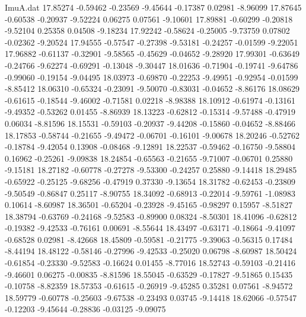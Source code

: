 \begin{filecontents}{ImuA.dat}
  17.85274   -0.59462   -0.23569   -9.45644   -0.17387    0.02981   -8.96099
  17.87645   -0.60538   -0.20937   -9.52224    0.06275    0.07561   -9.10601
  17.89881   -0.60299   -0.20818   -9.52104    0.25358    0.04508   -9.18234
  17.92242   -0.58624   -0.25005   -9.73759    0.07802   -0.02362   -9.20524
  17.94555   -0.57547   -0.27398   -9.53181   -0.24257   -0.01599   -9.22051
  17.96882   -0.61137   -0.32901   -9.58565   -0.45629   -0.04652   -9.28920
  17.99301   -0.63649   -0.24766   -9.62274   -0.69291   -0.13048   -9.30447
  18.01636   -0.71904   -0.19741   -9.64786   -0.99060   -0.19154   -9.04495
  18.03973   -0.69870   -0.22253   -9.49951   -0.92954   -0.01599   -8.85412
  18.06310   -0.65324   -0.23091   -9.50070   -0.83031   -0.04652   -8.86176
  18.08629   -0.61615   -0.18544   -9.46002   -0.71581    0.02218   -8.98388
  18.10912   -0.61974   -0.13161   -9.49352   -0.53262    0.01455   -8.86939
  18.13223   -0.62812   -0.15314   -9.57488   -0.47919    0.06034   -8.81596
  18.15531   -0.59103   -0.20937   -9.44208   -0.15860   -0.04652   -8.88466
  18.17853   -0.58744   -0.21655   -9.49472   -0.06701   -0.16101   -9.00678
  18.20246   -0.52762   -0.18784   -9.42054    0.13908   -0.08468   -9.12891
  18.22537   -0.59462   -0.16750   -9.58804    0.16962   -0.25261   -9.09838
  18.24854   -0.65563   -0.21655   -9.71007   -0.06701    0.25880   -9.15181
  18.27182   -0.60778   -0.27278   -9.53300   -0.24257    0.25880   -9.14418
  18.29485   -0.65922   -0.25125   -9.68256   -0.47919    0.37330   -9.13654
  18.31782   -0.62453   -0.23809   -9.50549   -0.86847    0.25117   -8.90755
  18.34092   -0.68913   -0.22014   -9.59761   -1.08983    0.10614   -8.60987
  18.36501   -0.65204   -0.23928   -9.45165   -0.98297    0.15957   -8.51827
  18.38794   -0.63769   -0.24168   -9.52583   -0.89900    0.08324   -8.50301
  18.41096   -0.62812   -0.19382   -9.42533   -0.76161    0.00691   -8.55644
  18.43497   -0.63171   -0.18664   -9.41097   -0.68528    0.02981   -8.42668
  18.45809   -0.59581   -0.21775   -9.39063   -0.56315    0.17484   -8.44194
  18.48122   -0.58146   -0.27996   -9.42533   -0.25020    0.06798   -8.60987
  18.50424   -0.61854   -0.23330   -9.52583   -0.16624    0.01455   -8.77016
  18.52743   -0.59103   -0.21416   -9.46601    0.06275   -0.00835   -8.81596
  18.55045   -0.63529   -0.17827   -9.51865    0.15435   -0.10758   -8.82359
  18.57353   -0.61615   -0.26919   -9.45285    0.35281    0.07561   -8.94572
  18.59779   -0.60778   -0.25603   -9.67538   -0.23493    0.03745   -9.14418
  18.62066   -0.57547   -0.12203   -9.45644   -0.28836   -0.03125   -9.09075

\end{filecontents}
